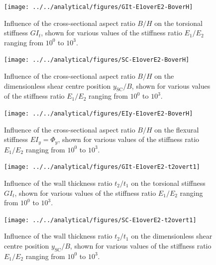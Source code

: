     \begin{figure}[!htpb] %
      \centering
      \texttt{[image: ../../analytical/figures/GIt-E1overE2-BoverH]}
      \caption[Influence of the cross-sectional aspect ratio $B/H$ on the torsional stiffness $GI_t$]{Influence of the cross-sectional aspect ratio $B/H$ on the torsional stiffness $GI_t$, shown for various values of the stiffness ratio $E_1/E_2$ ranging from $10^0$ to $10^3$. }\label{fig:GIt-E1overE2-BoverH}
    \end{figure}

    \begin{figure}[!htpb] %
      \centering
      \texttt{[image: ../../analytical/figures/SC-E1overE2-BoverH]}
      \caption[Influence of the cross-sectional aspect ratio $B/H$ on the dimensionless shear centre position $y_{\mathrm{SC}}/B$]{Influence of the cross-sectional aspect ratio $B/H$ on the dimensionless shear centre position $y_{\mathrm{SC}}/B$, shown for various values of the stiffness ratio $E_1/E_2$ ranging from $10^0$ to $10^3$. }\label{fig:SC-E1overE2-BoverH}
    \end{figure}

    \begin{figure}[!htpb] %
      \centering
      \texttt{[image: ../../analytical/figures/EIy-E1overE2-BoverH]}
      \caption[Influence of the cross-sectional aspect ratio $B/H$ on the flexural stiffness $EI_y$]{Influence of the cross-sectional aspect ratio $B/H$ on the flexural stiffness $EI_y = \Phi_y$, shown for various values of the stiffness ratio $E_1/E_2$ ranging from $10^0$ to $10^3$. }\label{fig:EIy-E1overE2-BoverH}
    \end{figure}

    \begin{figure}[!htpb] %
      \centering
      \texttt{[image: ../../analytical/figures/GIt-E1overE2-t2overt1]}
      \caption[Influence of the wall thickness ratio $t_2/t_1$ on the torsional stiffness $GI_t$]{Influence of the wall thickness ratio $t_2/t_1$ on the torsional stiffness $GI_t$, shown for various values of the stiffness ratio $E_1/E_2$ ranging from $10^0$ to $10^3$. }\label{fig:GIt-E1overE2-t2overt1}
    \end{figure}

    \begin{figure}[!htpb] %
      \centering
      \texttt{[image: ../../analytical/figures/SC-E1overE2-t2overt1]}
      \caption[Influence of the wall thickness ratio $t_2/t_1$ on the dimensionless shear centre position $y_{\mathrm{SC}}/B$]{Influence of the wall thickness ratio $t_2/t_1$ on the dimensionless shear centre position $y_{\mathrm{SC}}/B$, shown for various values of the stiffness ratio $E_1/E_2$ ranging from $10^0$ to $10^3$. }\label{fig:SC-E1overE2-t2overt1}
    \end{figure}

